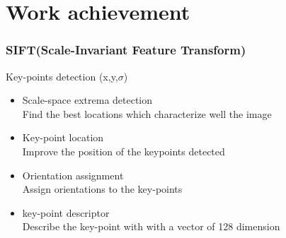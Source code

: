 \documentclass[xcolor=table]{beamer}
\begin{document}
\section{Work achievement}
\begin{frame} \frametitle{SIFT(Scale-Invariant Feature Transform)}

Key-points detection (x,y,$\sigma$)
\begin{itemize}

\item Scale-space extrema detection\\
Find the best locations which characterize well the image

 \item  Key-point location\\ 
 Improve the position of the keypoints detected 

\item Orientation assignment\\
 Assign orientations to the key-points 

\item key-point descriptor \\
Describe the key-point with with a vector of 128 dimension
\end{itemize}
\end{frame}
\end{document}
